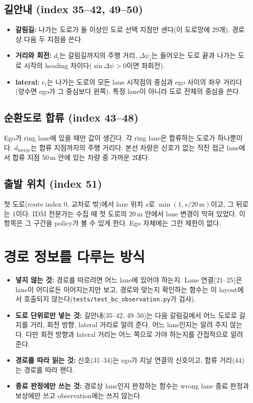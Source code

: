 \documentclass[10pt]{article}
\begin{document}
\subsection{길안내 (index 35--42, 49--50)}\label{sec:nav}
\begin{itemize}
  \item \textbf{갈림길:} 나가는 도로가 둘 이상인 도로 선택 지점만 센다(이 도로망에 29개). 경로상 다음 두 지점을 쓴다.
  \item \textbf{거리와 회전:} $d_i$는 갈림길까지의 주행 거리, $\Delta\psi_i$는 들어오는 도로 끝과 나가는 도로 시작의 heading 차이다($\sin\Delta\psi>0$이면 좌회전).
  \item \textbf{lateral:} $e_i$는 나가는 도로의 모든 lane 시작점의 중심과 ego 사이의 좌우 거리다(양수면 ego가 그 중심보다 왼쪽). 특정 lane이 아니라 도로 전체의 중심을 쓴다.
\end{itemize}

\subsection{순환도로 합류 (index 43--48)}
Ego가 ring lane에 있을 때만 값이 생긴다. 각 ring lane은 합류하는 도로가 하나뿐이다. $d_{\mathrm{merge}}$는 합류 지점까지의 주행 거리다. 본선 차량은 신호가 없는 직진 접근 lane에서 합류 지점 50\,m 안에 있는 차량 중 가까운 2대다.

\subsection{출발 위치 (index 51)}
첫 도로(route index 0, 교차로 밖)에서 lane 위치 $s$로 $\min(1, s/20\,\mathrm{m})$이고, 그 뒤로는 1이다. IDM 전문가는 수집 때 첫 도로의 20\,m 안에서 lane 변경이 막혀 있었다. 이 항목은 그 구간을 policy가 볼 수 있게 한다. Ego 자체에는 그런 제한이 없다.

\section{경로 정보를 다루는 방식}\label{sec:route}

\begin{itemize}
  \item \textbf{넣지 않는 것:} 경로를 따르려면 어느 lane에 있어야 하는지. Lane 연결(21--25)은 lane이 어디로든 이어지는지만 보고, 경로와 맞는지 확인하는 함수는 이 layout에서 호출되지 않는다(\texttt{tests/test\_bc\_observation.py}가 검사).
  \item \textbf{도로 단위로만 넣는 것:} 길안내(35--42, 49--50)는 다음 갈림길에서 어느 도로로 갈지를 거리, 회전 방향, lateral 거리로 알려 준다. 어느 lane인지는 알려 주지 않는다. 다만 회전 방향과 lateral 거리는 어느 쪽으로 가야 하는지를 간접적으로 알려 준다.
  \item \textbf{경로를 따라 읽는 것:} 신호(31--34)는 ego가 지날 연결의 신호이고, 합류 거리(44)는 경로를 따라 잰다.
  \item \textbf{종료 판정에만 쓰는 것:} 경로상 lane인지 판정하는 함수는 wrong lane 종료 판정과 보상에만 쓰고 observation에는 쓰지 않는다.
\end{itemize}
\end{document}
